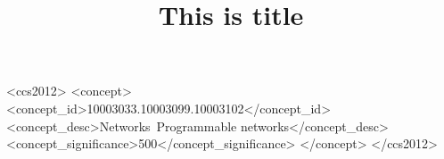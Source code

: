 \documentclass[sigconf,10pt,twocolumn]{sty/acmart}
\begin{document}
\title{This is title}



\begin{CCSXML}
<ccs2012>
<concept>
<concept_id>10003033.10003099.10003102</concept_id>
<concept_desc>Networks~Programmable networks</concept_desc>
<concept_significance>500</concept_significance>
</concept>
</ccs2012>
\end{CCSXML}






\maketitle










\end{document}
